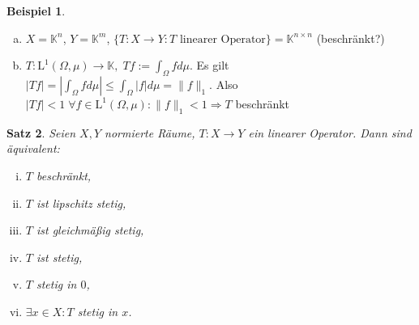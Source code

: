 \documentclass[ngerman]{report}
\theoremstyle{plain}%
\newtheorem{thm}{Satz}[chapter]
\theoremstyle{definition}%
\newtheorem{bsp}[thm]{Beispiel}
\theoremstyle{myStyle}
\newcommand{\K}{\mathbb{K}}
\newcommand{\lL}[2][\Omega,\mu]{\text{L}^{#2}(#1)} %
\newcommand{\norm}[1]{\|#1\|}
\newcommand{\intl}[1]{\int_\Omega #1 d\mu} %
\newcommand{\df}{\Rightarrow} %
\begin{document}
	\begin{bsp}
		\begin{enumerate}[a)]
			\item $X = \K^n$, $Y = \K^m$, $\{T: X\to Y: T \text{ linearer Operator}\} = \K^{n \times n}$
			(beschränkt?)
			\item $T: \lL{1} \to \K, \; Tf := \intl{f}.$ 
				Es gilt $|Tf| = |\intl{f}| \leq \intl{|f|} = \norm{f}_1.$
				Also $|Tf| < 1 \; \forall f \in \lL{1}: \norm{f}_1 < 1 \df T$ beschränkt
		\end{enumerate}
	\end{bsp}

	\begin{thm}
		Seien $X,Y$ normierte Räume, $T: X\to Y$ ein linearer Operator. Dann sind äquivalent:
			\begin{enumerate}[(i)]
				\item $T$ beschränkt,
				\item $T$ ist lipschitz stetig,
				\item $T$ ist gleichmäßig stetig,
				\item $T$ ist stetig,
				\item $T$ stetig in $0$,
				\item $\exists x \in X: T$ stetig in $x$.
			\end{enumerate}
	\end{thm}

\end{document}
